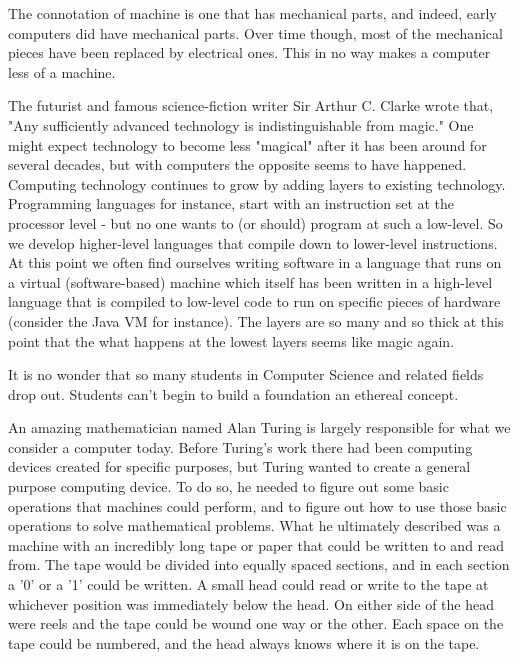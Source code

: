 \documentclass[11pt,fleqn]{book} %
\begin{document}
The connotation of machine is one that has mechanical parts, and indeed, early computers did have mechanical parts.  Over time though, most of the mechanical pieces have been replaced by electrical ones.  This in no way makes a computer less of a machine.

The futurist and famous science-fiction writer Sir Arthur C. Clarke wrote that, "Any sufficiently advanced technology is indistinguishable from magic."  One might expect technology to become less "magical" after it has been around for several decades, but with computers the opposite seems to have happened.  Computing technology continues to grow by adding layers to existing technology.  Programming languages for instance, start with an instruction set at the processor level - but no one wants to (or should) program at such a low-level.  So we develop higher-level languages that compile down to lower-level instructions. At this point we often find ourselves writing software in a language that runs on a virtual (software-based) machine which itself has been written in a high-level language that is compiled to low-level code to run on specific pieces of hardware (consider the Java VM for instance).  The layers are so many and so thick at this point that the what happens at the lowest layers seems like magic again. 

It is no wonder that so many students in Computer Science and related fields drop out.  Students can't begin to build a foundation an ethereal concept.

An amazing mathematician named Alan Turing is largely responsible for what we consider a computer today.  Before Turing's work there had been computing devices created for specific purposes, but Turing wanted to create a general purpose computing device.  To do so, he needed to figure out some basic operations that machines could perform, and to figure out how to use those basic operations to solve mathematical problems.  What he ultimately described was a machine with an incredibly long tape or paper that could be written to and read from.  The tape would be divided into equally spaced sections, and in each section a '0' or a '1' could be written.  A small head could read or write to the tape at whichever position was immediately below the head.  On either side of the head were reels and the tape could be wound one way or the other.  Each space on the tape could be numbered, and the head always knows where it is on the tape.
\end{document}

